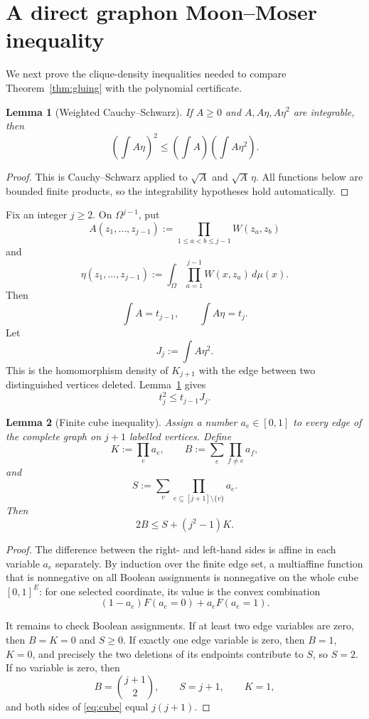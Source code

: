 \documentclass[11pt]{article}
\newtheorem{lemma}{Lemma}
\begin{document}
\section{A direct graphon Moon--Moser inequality}

We next prove the clique-density inequalities needed to compare
Theorem~\ref{thm:gluing} with the polynomial certificate.

\begin{lemma}[Weighted Cauchy--Schwarz]\label{lem:weighted-cs}
If \(A\ge0\) and \(A,A\eta,A\eta^2\) are integrable, then
\[
    \left(\int A\eta\right)^2
    \le
    \left(\int A\right)\left(\int A\eta^2\right).
\]
\end{lemma}

\begin{proof}
This is Cauchy--Schwarz applied to \(\sqrt A\) and \(\sqrt A\,\eta\).
All functions below are bounded finite products, so the integrability
hypotheses hold automatically.
\end{proof}

Fix an integer \(j\ge2\).  On \(\Omega^{j-1}\), put
\[
    A(z_1,\dots,z_{j-1})
    :=
    \prod_{1\le a<b\le j-1}W(z_a,z_b)
\]
and
\[
    \eta(z_1,\dots,z_{j-1})
    :=
    \int_\Omega\prod_{a=1}^{j-1}W(x,z_a)\,d\mu(x).
\]
Then
\[
    \int A=t_{j-1},
    \qquad
    \int A\eta=t_j.
\]
Let
\[
    J_j:=\int A\eta^2.
\]
This is the homomorphism density of \(K_{j+1}\) with the edge between two
distinguished vertices deleted.  Lemma~\ref{lem:weighted-cs} gives
\begin{equation}\label{eq:clique-cs}
    t_j^2\le t_{j-1}J_j.
\end{equation}

\begin{lemma}[Finite cube inequality]\label{lem:cube}
Assign a number \(a_e\in[0,1]\) to every edge of the complete graph on
\(j+1\) labelled vertices.  Define
\[
    K:=\prod_ea_e,
    \qquad
    B:=\sum_e\prod_{f\ne e}a_f,
\]
and
\[
    S:=\sum_v
       \prod_{e\subseteq [j+1]\setminus\{v\}}a_e.
\]
Then
\begin{equation}\label{eq:cube}
    2B\le S+(j^2-1)K.
\end{equation}
\end{lemma}

\begin{proof}
The difference between the right- and left-hand sides is affine in each
variable \(a_e\) separately.  By induction over the finite edge set, a
multiaffine function that is nonnegative on all Boolean assignments is
nonnegative on the whole cube \([0,1]^E\): for one selected coordinate,
its value is the convex combination
\[
    (1-a_e)F(a_e=0)+a_eF(a_e=1).
\]

It remains to check Boolean assignments.  If at least two edge variables are
zero, then \(B=K=0\) and \(S\ge0\).  If exactly one edge variable is zero,
then \(B=1\), \(K=0\), and precisely the two deletions of its endpoints
contribute to \(S\), so \(S=2\).  If no variable is zero, then
\[
    B=\binom{j+1}{2},
    \qquad S=j+1,
    \qquad K=1,
\]
and both sides of \eqref{eq:cube} equal \(j(j+1)\).
\end{proof}
\end{document}
